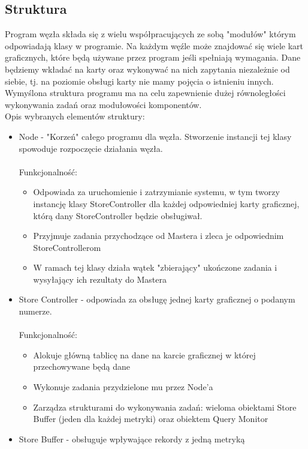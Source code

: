 \documentclass[paper=a4, fontsize=11pt]{scrartcl} %
\numberwithin{equation}{section} %
\numberwithin{figure}{section} %
\numberwithin{table}{section} %
\begin{document}
	\subsection{Struktura}
		Program węzła składa się z wielu współpracujących ze sobą "modułów" którym odpowiadają klasy w programie. Na każdym węźle może znajdować się
		wiele kart graficznych, które będą używane przez program jeśli spełniają wymagania. Dane będziemy wkładać na karty oraz wykonywać na nich zapytania
		niezależnie od siebie, tj. na poziomie obsługi karty nie mamy pojęcia o istnieniu innych. Wymyślona struktura programu ma na celu zapewnienie dużej 
		równoległości wykonywania zadań oraz modułowości komponentów. \\
		Opis wybranych elementów struktury:
		\begin{itemize}
			\item Node - "Korzeń" całego programu dla węzła. Stworzenie instancji tej klasy spowoduje rozpoczęcie działania węzła. \\ \\
				Funkcjonalność: 
				\begin{itemize}
					\item Odpowiada za uruchomienie i zatrzymianie systemu, w tym tworzy instancję klasy StoreController dla każdej odpowiedniej karty
						graficznej, którą dany StoreController będzie obsługiwał.
					\item Przyjmuje zadania przychodzące od Mastera i zleca je odpowiednim StoreControllerom
					\item W ramach tej klasy działa wątek "zbierający" ukończone zadania i wysyłający ich rezultaty do Mastera
				\end{itemize}
			\item Store Controller - odpowiada za obsługę jednej karty graficznej o podanym numerze. \\ \\
				Funkcjonalność: 
				\begin{itemize}
					\item Alokuje główną tablicę na dane na karcie graficznej w której przechowywane będą dane
					\item Wykonuje zadania przydzielone mu przez Node'a
					\item Zarządza strukturami do wykonywania zadań: wieloma obiektami Store Buffer (jeden dla każdej metryki) oraz obiektem Query Monitor
				\end{itemize}
			\item Store Buffer - obsługuje wpływające rekordy z jedną metryką \\ \\

\end{itemize}
\end{document}
